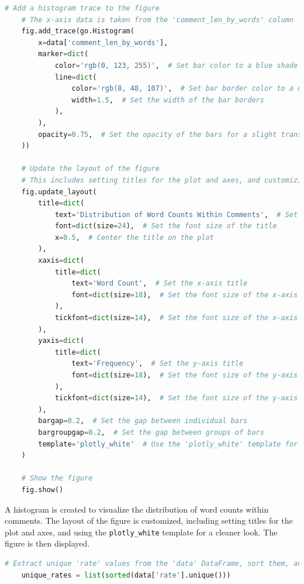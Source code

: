 \documentclass{solutionclass} %
\begin{document}
\begin{solution}
\begin{lstlisting}[language=Python, basicstyle=\ttfamily\footnotesize, keywordstyle=\color{blue}, commentstyle=\color{gray}]
    # Add a histogram trace to the figure
    # The x-axis data is taken from the 'comment_len_by_words' column
    fig.add_trace(go.Histogram(
        x=data['comment_len_by_words'],
        marker=dict(
            color='rgb(0, 123, 255)',  # Set bar color to a blue shade
            line=dict(
                color='rgb(8, 48, 107)',  # Set bar border color to a darker blue
                width=1.5,  # Set the width of the bar borders
            ),
        ),
        opacity=0.75,  # Set the opacity of the bars for a slight transparency effect
    ))
    
    # Update the layout of the figure
    # This includes setting titles for the plot and axes, and customizing the appearance
    fig.update_layout(
        title=dict(
            text='Distribution of Word Counts Within Comments',  # Set the title of the plot
            font=dict(size=24),  # Set the font size of the title
            x=0.5,  # Center the title on the plot
        ),
        xaxis=dict(
            title=dict(
                text='Word Count',  # Set the x-axis title
                font=dict(size=18),  # Set the font size of the x-axis title
            ),
            tickfont=dict(size=14),  # Set the font size of the x-axis tick labels
        ),
        yaxis=dict(
            title=dict(
                text='Frequency',  # Set the y-axis title
                font=dict(size=18),  # Set the font size of the y-axis title
            ),
            tickfont=dict(size=14),  # Set the font size of the y-axis tick labels
        ),
        bargap=0.2,  # Set the gap between individual bars
        bargroupgap=0.2,  # Set the gap between groups of bars
        template='plotly_white'  # Use the 'plotly_white' template for a cleaner look
    )
    
    # Show the figure
    fig.show()
    \end{lstlisting}
    
    A histogram is created to visualize the distribution of word counts within comments. The layout of the figure is customized, including setting titles for the plot and axes, and using the \texttt{plotly\_white} template for a cleaner look. The figure is then displayed.
    
    \begin{lstlisting}[language=Python, basicstyle=\ttfamily\footnotesize, keywordstyle=\color{blue}, commentstyle=\color{gray}]
    # Extract unique 'rate' values from the 'data' DataFrame, sort them, and convert them into a list
    unique_rates = list(sorted(data['rate'].unique()))
    

\end{lstlisting}
\end{solution}
\end{document}
